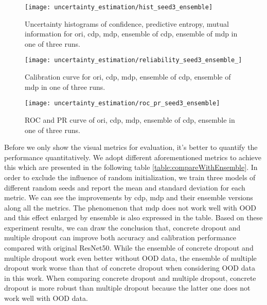 \begin{figure}[H]
	\begin{center}
		\texttt{[image: uncertainty\_estimation/hist\_seed3\_ensemble]}
		\caption{Uncertainty histograms of confidence, predictive entropy, mutual information for ori, cdp, mdp, ensemble of cdp, ensemble of mdp in one of three runs.}		
		\label{exp2_histo}
	\end{center}
\end{figure}

\begin{figure}[H]
	\begin{center}
		\texttt{[image: uncertainty\_estimation/reliability\_seed3\_ensemble\_]}
		\caption{Calibration curve for ori, cdp, mdp, ensemble of cdp, ensemble of mdp in one of three runs.}		
		\label{exp2_reliability}
	\end{center}
\end{figure}

\begin{figure}[H]
	\begin{center}
		\texttt{[image: uncertainty\_estimation/roc\_pr\_seed3\_ensemble]}
		\caption{ROC and PR curve of ori, cdp, mdp, ensemble of cdp, ensemble in one of three runs.}		
		\label{exp2_roc_pr}
	\end{center} 
\end{figure}

Before we only show the visual metrics for evaluation, it's better to quantify the performance quantitatively. We adopt different aforementioned metrics to achieve this which are presented in the following table \ref{table:compareWithEnsemble}. In order to exclude the influence of random initialization, we train three models of different random seeds and report the mean and standard deviation for each metric. We can see the improvements by cdp, mdp and their ensemble versions along all the metrics. The phenomenon that mdp does not work well with OOD and this effect enlarged by ensemble is also expressed in the table. Based on these experiment results, we can draw the conclusion that, concrete dropout and multiple dropout can improve both accuracy and calibration performance compared with original ResNet50. While the ensemble of concrete dropout and multiple dropout work even better without OOD data, the ensemble of multiple dropout work worse than that of concrete dropout when considering OOD data in this work. When comparing concrete dropout and multiple dropout, concrete dropout is more robust than multiple dropout because the latter one does not work well with OOD data.

